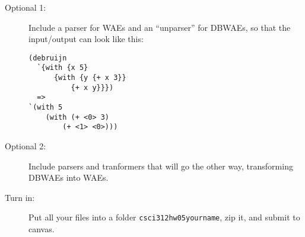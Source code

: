 \documentclass[12pt]{article}
\begin{document}
\begin{description}
\item[Optional 1:] Include a parser for WAEs and an ``unparser'' for DBWAEs,
so that the input/output can look like this:

\begin{lstlisting}
(debruijn
  `{with {x 5}
      {with {y {+ x 3}}
          {+ x y}}})
  =>
`(with 5
    (with (+ <0> 3)
        (+ <1> <0>)))
\end{lstlisting} 

\item[Optional 2:]  Include parsers and tranformers that will go the other
way, transforming DBWAEs into WAEs.


\item[Turn in:] Put all your files into a folder {\tt csci312hw05yourname},
zip it, and submit to canvas.


\end{description}
\end{document}
